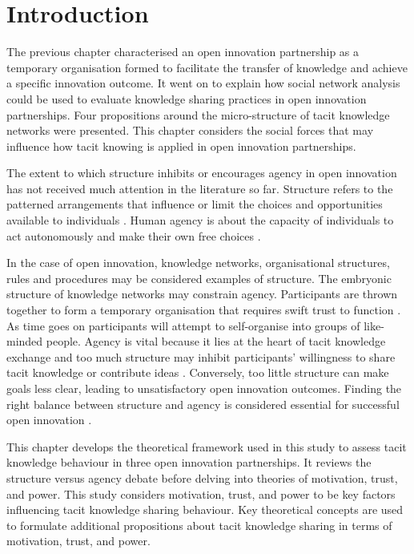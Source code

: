 \section{Introduction}

The previous chapter characterised an open innovation partnership as a temporary organisation formed to facilitate the transfer of knowledge and achieve a specific innovation outcome. It went on to explain how social network analysis could be used to evaluate knowledge sharing practices in open innovation partnerships. Four propositions around the micro-structure of tacit knowledge networks were presented. This chapter considers the social forces that may influence how tacit knowing is applied in open innovation partnerships. \medskip

The extent to which structure inhibits or encourages agency in open innovation has not received much attention in the literature so far. Structure refers to the patterned arrangements that influence or limit the choices and opportunities available to individuals \citep{bandura1999social}. Human agency is about the capacity of individuals to act autonomously and make their own free choices \citep{giddens1984constitution,emirbayer1994network}. \medskip

In the case of open innovation, knowledge networks, organisational structures, rules and procedures may be considered examples of structure. The embryonic structure of knowledge networks may constrain agency. Participants are thrown together to form a temporary organisation that requires swift trust to function \citep{meyerson1996swift}. As time goes on participants will attempt to self-organise into groups of like-minded people. Agency is vital because it lies at the heart of tacit knowledge exchange and too much structure may inhibit participants' willingness to share tacit knowledge or contribute ideas \citep{lam2000tacit}. Conversely, too little structure can make goals less clear, leading to unsatisfactory open innovation outcomes. Finding the right balance between structure and agency is considered essential for successful open innovation \citep{davis2010agency}. \medskip

This chapter develops the theoretical framework used in this study to assess tacit knowledge behaviour in three open innovation partnerships. It reviews the structure versus agency debate before delving into theories of motivation, trust, and power. This study considers motivation, trust, and power to be key factors influencing tacit knowledge sharing behaviour. Key theoretical concepts are used to formulate additional propositions about tacit knowledge sharing in terms of motivation, trust, and power. 

